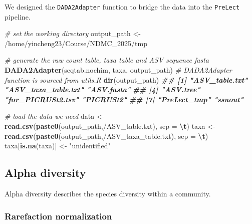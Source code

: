 \documentclass[
]{article}
\newenvironment{Shaded}{\begin{snugshade}}{\end{snugshade}}
\newcommand{\AttributeTok}[1]{\textcolor[rgb]{0.13,0.29,0.53}{#1}}
\newcommand{\CommentTok}[1]{\textcolor[rgb]{0.56,0.35,0.01}{\textit{#1}}}
\newcommand{\DocumentationTok}[1]{\textcolor[rgb]{0.56,0.35,0.01}{\textbf{\textit{#1}}}}
\newcommand{\FunctionTok}[1]{\textcolor[rgb]{0.13,0.29,0.53}{\textbf{#1}}}
\newcommand{\NormalTok}[1]{#1}
\newcommand{\OtherTok}[1]{\textcolor[rgb]{0.56,0.35,0.01}{#1}}
\newcommand{\SpecialCharTok}[1]{\textcolor[rgb]{0.81,0.36,0.00}{\textbf{#1}}}
\newcommand{\StringTok}[1]{\textcolor[rgb]{0.31,0.60,0.02}{#1}}
\begin{document}
We designed the \texttt{DADA2Adapter} function to bridge the data into
the \texttt{PreLect} pipeline.

\begin{Shaded}
\begin{Highlighting}[]
\CommentTok{\# set the working  directory }
\NormalTok{output\_path }\OtherTok{\textless{}{-}} \StringTok{\textquotesingle{}/home/yincheng23/Course/NDMC\_2025/tmp\textquotesingle{}}

\CommentTok{\# generate the raw count table, taxa table and ASV sequence fasta}
\FunctionTok{DADA2Adapter}\NormalTok{(seqtab.nochim, taxa, output\_path) }\CommentTok{\# DADA2Adapter function is sourced from utils.R}
\FunctionTok{dir}\NormalTok{(output\_path)}
\DocumentationTok{\#\# [1] "ASV\_table.txt"      "ASV\_taxa\_table.txt" "ASV.fasta"         }
\DocumentationTok{\#\# [4] "ASV.tree"           "for\_PICRUSt2.tsv"   "PICRUSt2"          }
\DocumentationTok{\#\# [7] "PreLect\_tmp"        "ssuout"}

\CommentTok{\# load the data we need}
\NormalTok{data }\OtherTok{\textless{}{-}} \FunctionTok{read.csv}\NormalTok{(}\FunctionTok{paste0}\NormalTok{(output\_path,}\StringTok{\textquotesingle{}/ASV\_table.txt\textquotesingle{}}\NormalTok{), }\AttributeTok{sep =} \StringTok{\textquotesingle{}}\SpecialCharTok{\textbackslash{}t}\StringTok{\textquotesingle{}}\NormalTok{)}
\NormalTok{taxa }\OtherTok{\textless{}{-}} \FunctionTok{read.csv}\NormalTok{(}\FunctionTok{paste0}\NormalTok{(output\_path,}\StringTok{\textquotesingle{}/ASV\_taxa\_table.txt\textquotesingle{}}\NormalTok{), }\AttributeTok{sep =} \StringTok{\textquotesingle{}}\SpecialCharTok{\textbackslash{}t}\StringTok{\textquotesingle{}}\NormalTok{)}
\NormalTok{taxa[}\FunctionTok{is.na}\NormalTok{(taxa)] }\OtherTok{\textless{}{-}} \StringTok{"unidentified"}
\end{Highlighting}
\end{Shaded}

\hypertarget{alpha-diversity}{%
\subsection{Alpha diversity}\label{alpha-diversity}}

Alpha diversity describes the species diversity within a community.

\hypertarget{rarefaction-normalization}{%
\subsubsection{Rarefaction
normalization}\label{rarefaction-normalization}}
\end{document}
